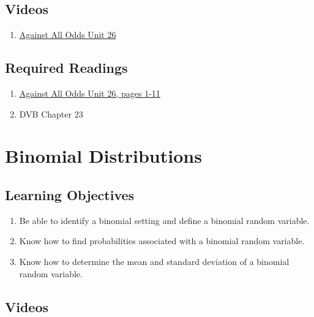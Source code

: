 \documentclass[letterpaper,10pt,twocolumn,twoside,printwatermark=false]{pinp}
\providecommand{\tightlist}{%
  \setlength{\itemsep}{0pt}\setlength{\parskip}{0pt}}
\begin{document}
\hypertarget{videos-1}{%
\subsection{Videos}\label{videos-1}}

\begin{enumerate}
\def\labelenumi{\arabic{enumi}.}
\tightlist
\item
  \href{https://www.learner.org/courses/againstallodds/unitpages/unit26.html}{Against
  All Odds Unit 26}
\end{enumerate}

\hypertarget{required-readings-2}{%
\subsection{Required Readings}\label{required-readings-2}}

\begin{enumerate}
\item \href{https://www.learner.org/courses/againstallodds/pdfs/AgainstAllOdds_StudentGuide_Unit26.pdf#page=1}{Against All Odds Unit 26, pages 1-11}
\item DVB Chapter 23
\end{enumerate}

\hypertarget{binomial-distributions}{%
\section{Binomial Distributions}\label{binomial-distributions}}

\hypertarget{learning-objectives-3}{%
\subsection{Learning Objectives}\label{learning-objectives-3}}

\begin{enumerate}
\def\labelenumi{\arabic{enumi}.}
\tightlist
\item
  Be able to identify a binomial setting and define a binomial random
  variable.
\item
  Know how to find probabilities associated with a binomial random
  variable.
\item
  Know how to determine the mean and standard deviation of a binomial
  random variable.
\end{enumerate}

\hypertarget{videos-2}{%
\subsection{Videos}\label{videos-2}}
\end{document}
